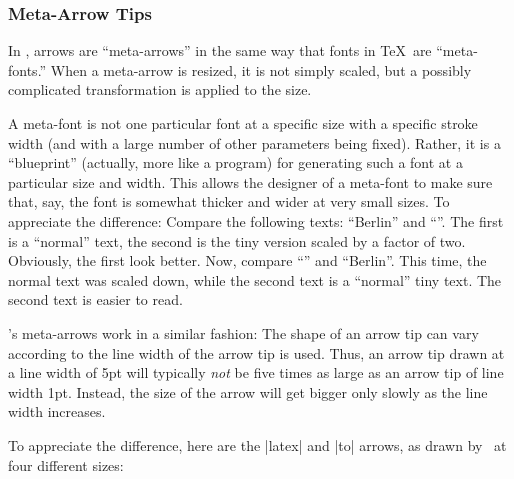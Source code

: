 \subsubsection{Meta-Arrow Tips}

In \pgfname, arrows are ``meta-arrows'' in the same way that fonts in
\TeX\ are ``meta-fonts.'' When a meta-arrow is resized, it is not
simply scaled, but a possibly complicated transformation is applied to
the size.

A meta-font is not one particular font at a specific size with a
specific stroke width (and with a large number of other parameters
being fixed). Rather, it is a ``blueprint'' (actually, more like a
program) for generating such a font at a particular size and
width. This allows the designer of a meta-font to make sure that, say,
the font is somewhat thicker and wider at very small sizes. To
appreciate the difference: Compare the following texts: ``Berlin'' and
``''. The first is a ``normal'' text, the second is the tiny
version scaled by a factor of two. Obviously, the first look
better. Now, compare  ``'' and ``{\tiny Berlin}''. This time, the normal
text was scaled down, while the second text is a ``normal'' tiny
text. The second text is easier to read. 

\pgfname's meta-arrows work in a similar fashion: The shape of an
arrow tip can vary according to the line width of the arrow tip is
used. Thus, an arrow tip drawn at a line width of 5pt will typically
\emph{not} be five times as large as an arrow tip of line width
1pt. Instead, the size of the arrow will get bigger only slowly as the
line width increases.

To appreciate the difference, here are the |latex| and |to| arrows, as
drawn by \pgfname\ at four different sizes:

\medskip
{}

